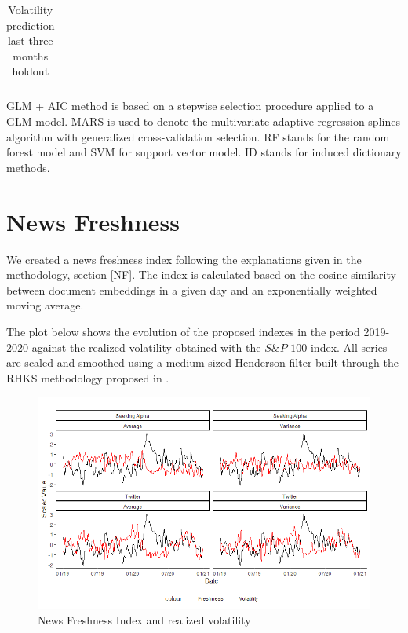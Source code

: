 \documentclass[a4paper, 12pt]{report}
\begin{document}
\begin{table}[H]
\begin{threeparttable}
\begin{tabular}{rrrrrrrrr}
    \end{tabular}
    \begin{tablenotes}
      \footnotesize
      \item GLM + AIC method is based on a stepwise selection procedure applied to a GLM model. MARS is used to denote the multivariate adaptive regression splines algorithm with generalized cross-validation selection. RF stands for the random forest model and SVM for support vector model. ID stands for induced dictionary methods.
    \end{tablenotes}
    \caption{Volatility prediction last three months holdout}
    \label{Tab:Volatility2}
  \end{threeparttable}
    \end{table}
    
    \section{News Freshness}
    
    We created a news freshness index following the explanations given in the methodology, section \ref{NF}. The index is calculated based on the cosine similarity between document embeddings in a given day and an exponentially weighted moving average. 
    
    The plot below shows the evolution of the proposed indexes in the period 2019-2020 against the realized volatility obtained with the $S\&P$ $100$ index. All series are scaled and smoothed using a medium-sized Henderson filter built through the RHKS methodology proposed in \textcite{Dagum:2016}. 
    
    \begin{figure}[H]
    \centering
    \includegraphics[width=15cm]{graphs/500LineFresh.png}
    \caption{News Freshness Index and realized volatility}
    \label{Fig:LineFresh}
    \end{figure}
    
\end{document}
